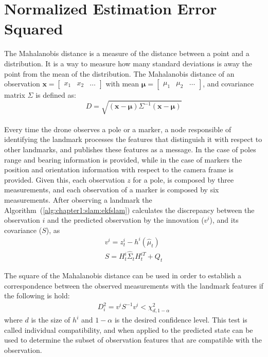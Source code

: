 \section{Normalized Estimation Error Squared}
\label{sec:chapter2:nees}
The Mahalanobis distance is a measure of the distance between a point and a distribution. It is a way to measure how many standard deviations is away the point from the mean of the distribution. The Mahalanobis distance of an observation $\bm{x} = \begin{bmatrix}x_1 & x_2 & \dots \end{bmatrix}$ with mean $\bm{\mu} = \begin{bmatrix}\mu_1 & \mu_2 & \dots \end{bmatrix}$, and covariance matrix $\Sigma$ is defined as:
\begin{equation}
    D = \sqrt{\left(\bm{x} - \bm{\mu}\right) \Sigma^{-1} \left(\bm{x} - \bm{\mu}\right)}
    \label{eq:chapter1:nees:mahalanobis}
\end{equation}\\
Every time the drone observes a pole or a marker, a node responsible of identifying the landmark processes the features that distinguish it with respect to other landmarks, and publishes these features as a message. In the case of poles range and bearing information is provided, while in the case of markers the position and orientation information with respect to the camera frame is provided. Given this, each observation $z$ for a pole, is composed by three measurements, and each observation of a marker is composed by six measurements. After observing a landmark the Algorithm~(\ref{alg:chapter1:slam:ekfslam}) calculates the discrepancy between the observation $i$ and the predicted observation by the innovation ($v^i$), and its covariance ($S$), as
\begin{align*}
    v^i =  z_t^i - h^i \left( \hat\mu_t \right)\\
    S = H_t^i \hat\Sigma_t H_t^{iT} + Q_t
\end{align*}

The square of the Mahalanobis distance can be used in order to establish a correspondence between the observed measurements with the landmark features if the following is hold:
\begin{align}
    D_i^2 = v^i S^{-1} v^i < \chi_{d, 1-\alpha}^2
    \label{eq:chapter2:nees:innov_test}
\end{align}
where $d$ is the size of $h^i$ and $1-\alpha$ is the desired confidence level. This test is called individual compatibility, and when applied to the predicted state can be used to determine the subset of observation features that are compatible with the observation.\\

